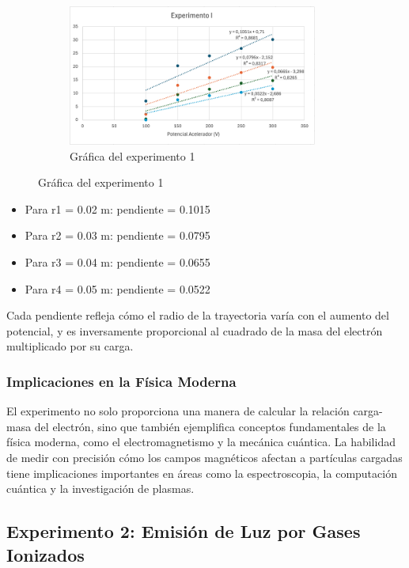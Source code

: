 \begin{figure}[H]
  \centering
  \begin{subfigure}[b]{\textwidth}
      \centering
      \includegraphics[width=0.9\textwidth]{Figures/1. Content/grafica-experimento-1.png}
      \caption{Gráfica del experimento 1}
      \label{fig: Grafica del experimento 1}
  \end{subfigure}
  \hfill
\end{figure}

\begin{itemize}
    \item Para r1 = 0.02 m: pendiente = 0.1015
    \item Para r2 = 0.03 m: pendiente = 0.0795
    \item Para r3 = 0.04 m: pendiente = 0.0655
    \item Para r4 = 0.05 m: pendiente = 0.0522
\end{itemize}

Cada pendiente refleja cómo el radio de la trayectoria varía con el aumento del potencial, y es inversamente proporcional al cuadrado de la masa del electrón multiplicado por su carga.

\subsubsection{Implicaciones en la Física Moderna}
El experimento no solo proporciona una manera de calcular la relación carga-masa del electrón, sino que también ejemplifica conceptos fundamentales de la física moderna, como el electromagnetismo y la mecánica cuántica. La habilidad de medir con precisión cómo los campos magnéticos afectan a partículas cargadas tiene implicaciones importantes en áreas como la espectroscopia, la computación cuántica y la investigación de plasmas.

\subsection{Experimento 2: Emisión de Luz por Gases Ionizados}

